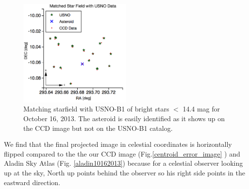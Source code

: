 \documentclass[authoryear, 12pt,5p, times]{elsarticle}
\begin{document}
	\begin{figure}[h!]
\includegraphics[width=0.5\textwidth]{figures/starfield_match}
\caption{ Matching starfield with USNO-B1 of bright stars $<$ 14.4 mag for October 16, 2013. The asteroid is easily identified as it shows up on the CCD image but not on the USNO-B1 catalog.}
\label{starfield_match}
\end{figure}
We find that the final projected image in celestial coordinates is horizontally flipped compared to the the our CCD image (Fig.\ref{centroid_error_image} ) and  Aladin Sky Atlas (Fig. \ref{aladin10162013}) because for a celestial observer looking up at the sky, North up points behind the observer so his right side points in the eastward direction.


\end{document}
